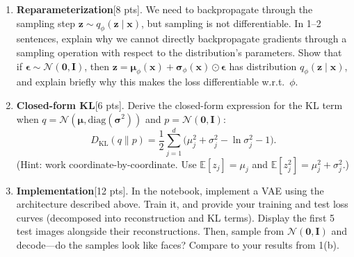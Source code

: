 \documentclass[submit]{../harvardml}
\newcommand{\E}{\mathbb{E}}
\newcommand{\KL}{D_{\mathrm{KL}}}
\newcommand{\bx}{\mathbf{x}}
\newcommand{\bz}{\mathbf{z}}
\begin{document}
\begin{problem}
\begin{enumerate}
\begin{enumerate}

\item \textbf{Reparameterization}[8 pts]. We need to backpropagate through the sampling step $\bz \sim q_\phi(\bz \mid \bx)$, but sampling is not differentiable.
 In 1--2 sentences, explain why we cannot directly backpropagate gradients through a sampling operation with respect to the distribution's parameters.
  Show that if $\bm{\epsilon} \sim \mathcal{N}(\bm{0}, \mathbf{I})$, then $\bz = \bm{\mu}_\phi(\bx) + \bm{\sigma}_\phi(\bx) \odot \bm{\epsilon}$ has distribution $q_\phi(\bz \mid \bx)$, and explain briefly why this makes the loss differentiable w.r.t.\ $\phi$.

\item \textbf{Closed-form KL}[6 pts]. Derive the closed-form expression for the KL term when $q = \mathcal{N}(\bm{\mu}, \mathrm{diag}(\bm{\sigma}^2))$ and $p = \mathcal{N}(\bm{0}, \mathbf{I})$:
\[
  \KL(q \| p) = \frac{1}{2}\sum_{j=1}^{d}\Big(\mu_j^2 + \sigma_j^2 - \ln \sigma_j^2 - 1\Big).
\]
(Hint: work coordinate-by-coordinate. Use $\E[z_j] = \mu_j$ and $\E[z_j^2] = \mu_j^2 + \sigma_j^2$.)

\item \textbf{Implementation}[12 pts]. In the notebook, implement a VAE using the architecture described above. Train it, and provide your training and test loss curves (decomposed into reconstruction and KL terms). Display the first 5 test images alongside their reconstructions. Then, sample from $\mathcal{N}(\bm{0}, \mathbf{I})$ and decode---do the samples look like faces? Compare to your results from 1(b).

\end{enumerate}
\end{enumerate}
\end{problem}

\newpage
\end{document}
